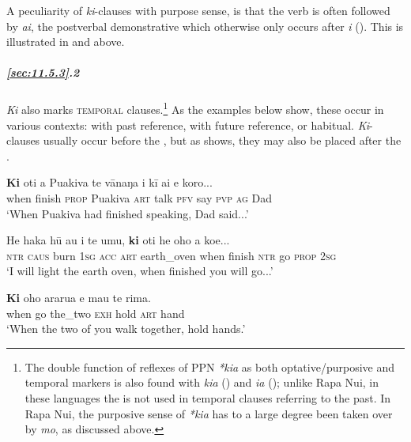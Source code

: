 A peculiarity of \textit{ki}{}-clauses with purpose sense, is that the verb is often followed by \textit{ai}, the postverbal demonstrative which otherwise only occurs after \textit{i} (). This is illustrated in  and  above.

\subparagraph{\ref{sec:11.5.3}.2} \textit{Ki} also marks \textsc{temporal} clauses.\footnote{\label{fn:525}The double function of reflexes of PPN \textit{*kia} as both optative/purposive and temporal markers is also found with  \textit{kia} (\citealt[62, 459]{Bauer1993}) and  \textit{{\ꞌ}ia} (\citealt[138–139]{LazardPeltzer2000}); unlike Rapa Nui, in these languages the  is not used in temporal clauses referring to the past. In Rapa Nui, the purposive sense of \textit{*kia} has to a large degree been taken over by \textit{mo}, as discussed above.} As the examples below show, these occur in various contexts: with past reference, with future reference, or habitual. \textit{Ki}{}-clauses usually occur before the , but as  shows, they may also be placed after the .

\ea\label{ex:11.192}
\gll \textbf{Ki} oti a Puakiva te vānaŋa i kī ai e koro... \\
when finish \textsc{prop} Puakiva \textsc{art} talk \textsc{pfv} say \textsc{pvp} \textsc{ag} Dad \\

\glt 
‘When Puakiva had finished speaking, Dad said...’ \textstyleExampleref{[R229.490]} 
\z

\ea\label{ex:11.193}
\gll He haka hū au i te {\ꞌ}umu, \textbf{ki} oti he oho a koe... \\
\textsc{ntr} \textsc{caus} burn \textsc{1sg} \textsc{acc} \textsc{art} earth\_oven when finish \textsc{ntr} go \textsc{prop} \textsc{2sg} \\

\glt 
‘I will light the earth oven, when finished you will go...’ \textstyleExampleref{[R184.007]} 
\z

\ea\label{ex:11.194}
\gll \textbf{Ki} oho ararua e ma{\ꞌ}u te rima. \\
when go the\_two \textsc{exh} hold \textsc{art} hand \\

\glt 
‘When the two of you walk together, hold hands.’ \textstyleExampleref{[R166.004]} 
\z

